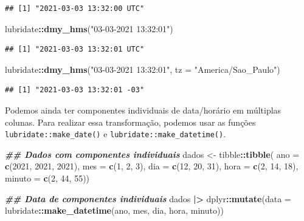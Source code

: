 \documentclass[
]{article}
\newenvironment{Shaded}{\begin{snugshade}}{\end{snugshade}}
\newcommand{\AttributeTok}[1]{\textcolor[rgb]{0.13,0.29,0.53}{#1}}
\newcommand{\DecValTok}[1]{\textcolor[rgb]{0.00,0.00,0.81}{#1}}
\newcommand{\DocumentationTok}[1]{\textcolor[rgb]{0.56,0.35,0.01}{\textbf{\textit{#1}}}}
\newcommand{\FunctionTok}[1]{\textcolor[rgb]{0.13,0.29,0.53}{\textbf{#1}}}
\newcommand{\NormalTok}[1]{#1}
\newcommand{\OtherTok}[1]{\textcolor[rgb]{0.56,0.35,0.01}{#1}}
\newcommand{\SpecialCharTok}[1]{\textcolor[rgb]{0.81,0.36,0.00}{\textbf{#1}}}
\newcommand{\StringTok}[1]{\textcolor[rgb]{0.31,0.60,0.02}{#1}}
\begin{document}
\begin{verbatim}
## [1] "2021-03-03 13:32:00 UTC"
\end{verbatim}

\begin{Shaded}
\begin{Highlighting}[]
\NormalTok{lubridate}\SpecialCharTok{::}\FunctionTok{dmy\_hms}\NormalTok{(}\StringTok{"03{-}03{-}2021 13:32:01"}\NormalTok{)}
\end{Highlighting}
\end{Shaded}

\begin{verbatim}
## [1] "2021-03-03 13:32:01 UTC"
\end{verbatim}

\begin{Shaded}
\begin{Highlighting}[]
\NormalTok{lubridate}\SpecialCharTok{::}\FunctionTok{dmy\_hms}\NormalTok{(}\StringTok{"03{-}03{-}2021 13:32:01"}\NormalTok{, }\AttributeTok{tz =} \StringTok{"America/Sao\_Paulo"}\NormalTok{)}
\end{Highlighting}
\end{Shaded}

\begin{verbatim}
## [1] "2021-03-03 13:32:01 -03"
\end{verbatim}

Podemos ainda ter componentes individuais de data/horário em múltiplas colunas. Para realizar essa transformação, podemos usar as funções \texttt{lubridate::make\_date()} e \texttt{lubridate::make\_datetime()}.

\begin{Shaded}
\begin{Highlighting}[]
\DocumentationTok{\#\# Dados com componentes individuais}
\NormalTok{dados }\OtherTok{\textless{}{-}}\NormalTok{ tibble}\SpecialCharTok{::}\FunctionTok{tibble}\NormalTok{(}
    \AttributeTok{ano =} \FunctionTok{c}\NormalTok{(}\DecValTok{2021}\NormalTok{, }\DecValTok{2021}\NormalTok{, }\DecValTok{2021}\NormalTok{),}
    \AttributeTok{mes =} \FunctionTok{c}\NormalTok{(}\DecValTok{1}\NormalTok{, }\DecValTok{2}\NormalTok{, }\DecValTok{3}\NormalTok{),}
    \AttributeTok{dia =} \FunctionTok{c}\NormalTok{(}\DecValTok{12}\NormalTok{, }\DecValTok{20}\NormalTok{, }\DecValTok{31}\NormalTok{),}
    \AttributeTok{hora =} \FunctionTok{c}\NormalTok{(}\DecValTok{2}\NormalTok{, }\DecValTok{14}\NormalTok{, }\DecValTok{18}\NormalTok{), }
    \AttributeTok{minuto =} \FunctionTok{c}\NormalTok{(}\DecValTok{2}\NormalTok{, }\DecValTok{44}\NormalTok{, }\DecValTok{55}\NormalTok{))}

\DocumentationTok{\#\# Data de componentes individuais}
\NormalTok{dados }\SpecialCharTok{|\textgreater{}} 
\NormalTok{    dplyr}\SpecialCharTok{::}\FunctionTok{mutate}\NormalTok{(}\AttributeTok{data =}\NormalTok{ lubridate}\SpecialCharTok{::}\FunctionTok{make\_datetime}\NormalTok{(ano, mes, dia, hora, minuto))}
\end{Highlighting}
\end{Shaded}
\end{document}
